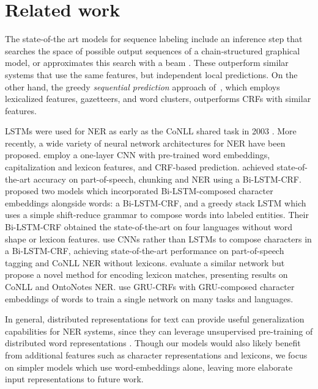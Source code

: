 \documentclass[11pt,letterpaper]{article}
\begin{document}
%
 
\section{Related work}



The state-of-the art models for sequence labeling include an inference step that searches the space of possible output sequences of a chain-structured graphical model, or approximates this search with a beam \citep{collobert2011natural, weiss2015structured, lample2016neural, ma2016end, chiu2016named}. These outperform similar systems that use the same features, but independent local predictions. On the other hand, the greedy \emph{sequential prediction} \citep{daume2009search} approach of~\citet{ratinov2009design}, which employs lexicalized features, gazetteers, and word clusters, outperforms CRFs with similar features. 









LSTMs \citep{hochreiter1997long} were used for NER as early as the CoNLL shared task in 2003 \citep{hammerton2003named, tjong2003introduction}. More recently, a wide variety of neural network architectures for NER have been proposed. \citet{collobert2011natural} employ a one-layer CNN with pre-trained word embeddings, capitalization and lexicon features, and CRF-based prediction. \citet{huang2015bidirectional} achieved state-of-the-art accuracy on part-of-speech, chunking and NER using a Bi-LSTM-CRF. \citet{lample2016neural} proposed two models which incorporated Bi-LSTM-composed character embeddings alongside words: a Bi-LSTM-CRF, and a greedy stack LSTM which uses a simple shift-reduce grammar to compose words into labeled entities. Their Bi-LSTM-CRF obtained the state-of-the-art on four languages without word shape or lexicon features. \citet{ma2016end} use CNNs rather than LSTMs to compose characters in a Bi-LSTM-CRF, achieving state-of-the-art performance on part-of-speech tagging and CoNLL NER without lexicons. \citet{chiu2016named} evaluate a similar network but propose a novel method for encoding lexicon matches, presenting results on CoNLL and OntoNotes NER. \citet{yang2016multi} use GRU-CRFs with GRU-composed character embeddings of words to train a single network on many tasks and languages. 

In general, distributed representations for text can provide useful generalization capabilities for NER systems, since they can leverage unsupervised pre-training of distributed word representations \citep{turian2010word,collobert2011natural,passos2014lexicon}. Though our models would also likely benefit from additional features such as character representations and lexicons, we focus on simpler models which use word-embeddings alone, leaving more elaborate input representations to future work. 
\end{document}
